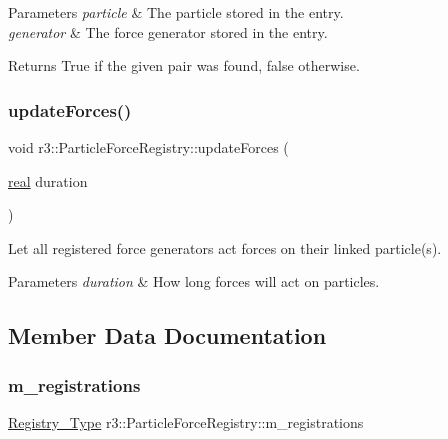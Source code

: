 \begin{DoxyParams}{Parameters}
{\em particle} & The particle stored in the entry. \\
\hline
{\em generator} & The force generator stored in the entry. \\
\hline
\end{DoxyParams}
\begin{DoxyReturn}{Returns}
True if the given pair was found, false otherwise. 
\end{DoxyReturn}
\mbox{\label{classr3_1_1_particle_force_registry_aff16efc19c65d28e39a38cbc936ede2a}} 
\subsubsection{\texorpdfstring{update\+Forces()}{updateForces()}}
{\footnotesize\ttfamily void r3\+::\+Particle\+Force\+Registry\+::update\+Forces (\begin{DoxyParamCaption}\item[{\mbox{\hyperlink{namespacer3_ab2016b3e3f743fb735afce242f0dc1eb}{real}}}]{duration }\end{DoxyParamCaption})}



Let all registered force generators act forces on their linked particle(s). 


\begin{DoxyParams}{Parameters}
{\em duration} & How long forces will act on particles. \\
\hline
\end{DoxyParams}


\subsection{Member Data Documentation}
\mbox{\label{classr3_1_1_particle_force_registry_ac0130d368fb6f3f8894bc83b615e193f}} 
\subsubsection{\texorpdfstring{m\+\_\+registrations}{m\_registrations}}
{\footnotesize\ttfamily \mbox{\hyperlink{classr3_1_1_particle_force_registry_ae769e654dbf539cf09c514e47768498c}{Registry\+\_\+\+Type}} r3\+::\+Particle\+Force\+Registry\+::m\+\_\+registrations\hspace{0.3cm}{\ttfamily [protected]}}



